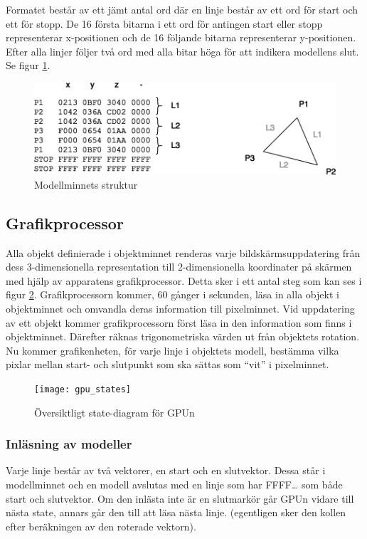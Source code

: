 \documentclass[a4paper]{article}
\begin{document}
    Formatet består av ett jämt antal ord där en linje består av ett ord för start och ett för
    stopp. De 16 första bitarna i ett ord för antingen start eller stopp representerar x-positionen
    och de 16 följande bitarna representerar y-positionen. Efter alla linjer följer två ord med 
    alla bitar höga för att indikera modellens slut. Se figur \ref{fig:model_mem_structure}.

    \begin{figure}[H]
        \centering
        \includegraphics[width=0.8\linewidth]{model_mem_structure}
        \caption{Modellminnets struktur}
        \label{fig:model_mem_structure}
    \end{figure}

    \subsection{Grafikprocessor}
    Alla objekt definierade i objektminnet renderas varje bildskärmsuppdatering från
    dess 3-dimensionella representation till 2-dimensionella koordinater på skärmen
    med hjälp av apparatens grafikprocessor. Detta sker i ett antal steg som kan ses
    i figur \ref{fig:gpu_states}. 
    Grafikprocessorn kommer, 60 gånger i sekunden, läsa in alla objekt i
    objektminnet och omvandla deras information till pixelminnet. Vid uppdatering av
    ett objekt kommer grafikprocessorn först läsa in den information som finns i
    objektminnet. Därefter räknas trigonometriska värden ut från objektets rotation.
    Nu kommer grafikenheten, för varje linje i objektets modell, bestämma vilka
    pixlar mellan start- och slutpunkt som ska sättas som “vit” i pixelminnet. 

    \begin{figure}[H]
        \centering
        \texttt{[image: gpu\_states]}
        \caption{Översiktligt state-diagram för GPUn}
        \label{fig:gpu_states}
    \end{figure}

    \subsubsection{Inläsning av modeller}
    Varje linje består  av två vektorer, en start och en slutvektor. Dessa står i
    modellminnet och en modell avslutas med en linje som har FFFF… som både start
    och slutvektor. Om den inlästa inte är en slutmarkör går GPUn vidare till nästa
    state, annars går den till att läsa nästa  linje. (egentligen sker den kollen
    efter beräkningen av den  roterade vektorn). 
\end{document}
